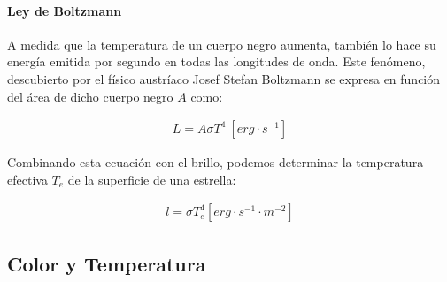 \documentclass{tufte-handout}
\begin{document}
\paragraph{Ley de Boltzmann}

A medida que la temperatura de un cuerpo negro aumenta, también lo hace su energía emitida por segundo en todas las longitudes de onda. Este fenómeno, descubierto por el físico austríaco Josef Stefan Boltzmann se expresa en función del área de dicho cuerpo negro $A$ como:

\begin{align}
  L = A \sigma T^4 ~ [erg \cdot s^{-1}]
\end{align}

Combinando esta ecuación con el brillo, podemos determinar la temperatura efectiva $T_e$ de la superficie de una estrella:

\begin{align}
  l = \sigma T_e^4 [erg \cdot s^{-1} \cdot m^{-2}]
\end{align}


\subsection{Color y Temperatura}
\end{document}

